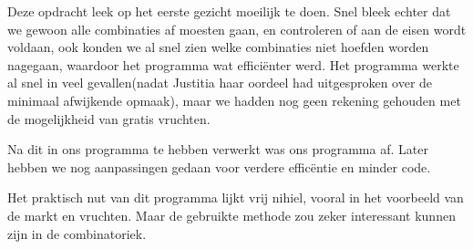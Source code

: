 Deze opdracht leek op het eerste gezicht moeilijk te doen. Snel bleek echter dat we gewoon alle combinaties af moesten gaan, en controleren of aan de eisen wordt voldaan, ook konden we al snel zien welke combinaties niet hoefden worden nagegaan, waardoor het programma wat effici\"enter werd. Het programma werkte al snel in veel gevallen(nadat Justitia haar oordeel had uitgesproken over de minimaal afwijkende opmaak), maar we hadden nog geen rekening gehouden met de mogelijkheid van gratis vruchten.

Na dit in ons programma te hebben verwerkt was ons programma af. Later hebben we nog aanpassingen gedaan voor verdere effic\"entie en minder code.

Het praktisch nut van dit programma lijkt vrij nihiel, vooral in het voorbeeld van de markt en vruchten. Maar de gebruikte methode zou zeker interessant kunnen zijn in de combinatoriek.